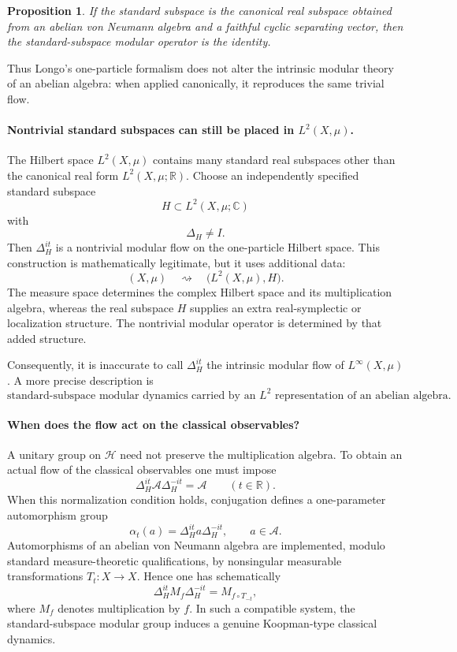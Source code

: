 \documentclass[a4paper,11pt]{article}
\newtheorem{proposition}[theorem]{Proposition}
\theoremstyle{definition}
\newcommand{\cH}{\mathcal{H}}
\begin{document}
\begin{proposition}
If the standard subspace is the canonical real subspace obtained from an abelian von Neumann algebra and a faithful cyclic separating vector, then the standard-subspace modular operator is the identity.
\end{proposition}

Thus Longo's one-particle formalism does not alter the intrinsic modular theory of an abelian algebra: when applied canonically, it reproduces the same trivial flow.

\paragraph{Nontrivial standard subspaces can still be placed in \(L^2(X,\mu)\).}
The Hilbert space \(L^2(X,\mu)\) contains many standard real subspaces other than the canonical real form \(L^2(X,\mu;\mathbb{R})\). Choose an independently specified standard subspace
\[
    H\subset L^2(X,\mu;\mathbb{C})
\]
with
\[
    \Delta_H\neq I.
\]
Then \(\Delta_H^{it}\) is a nontrivial modular flow on the one-particle Hilbert space. This construction is mathematically legitimate, but it uses additional data:
\[
    (X,\mu)
    \quad\rightsquigarrow\quad
    \bigl(L^2(X,\mu),H\bigr).
\]
The measure space determines the complex Hilbert space and its multiplication algebra, whereas the real subspace \(H\) supplies an extra real-symplectic or localization structure. The nontrivial modular operator is determined by that added structure.

Consequently, it is inaccurate to call \(\Delta_H^{it}\) the intrinsic modular flow of \(L^\infty(X,\mu)\). A more precise description is
\[
    \boxed{\text{standard-subspace modular dynamics carried by an }L^2
    \text{ representation of an abelian algebra}.}
\]

\paragraph{When does the flow act on the classical observables?}
A unitary group on \(\cH\) need not preserve the multiplication algebra. To obtain an actual flow of the classical observables one must impose
\[
    \Delta_H^{it}\mathcal{A}\Delta_H^{-it}=\mathcal{A}
    \qquad (t\in\mathbb{R}).
\]
When this normalization condition holds, conjugation defines a one-parameter automorphism group
\[
    \alpha_t(a)=\Delta_H^{it}a\Delta_H^{-it},
    \qquad a\in\mathcal{A}.
\]
Automorphisms of an abelian von Neumann algebra are implemented, modulo standard measure-theoretic qualifications, by nonsingular measurable transformations \(T_t:X\to X\). Hence one has schematically
\[
    \Delta_H^{it}M_f\Delta_H^{-it}
    =M_{f\circ T_{-t}},
\]
where \(M_f\) denotes multiplication by \(f\). In such a compatible system, the standard-subspace modular group induces a genuine Koopman-type classical dynamics.
\end{document}
